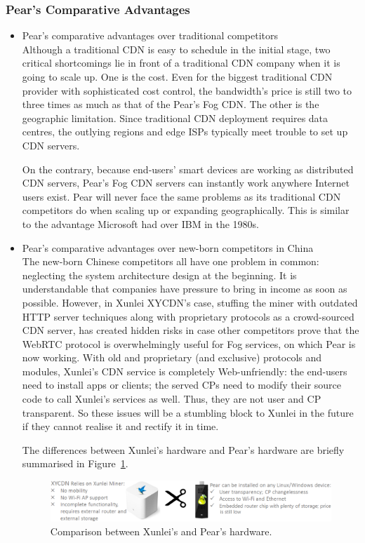 \subsubsection{Pear's Comparative Advantages}
\begin{itemize}
	\item Pear's comparative advantages over traditional competitors\\
	Although a traditional CDN is easy to schedule in the initial stage, two critical shortcomings lie in front of a traditional CDN company when it is going to scale up. One is the cost. Even for the biggest traditional CDN provider with sophisticated cost control, the bandwidth's price is still two to three times as much as that of the Pear's Fog CDN. The other is the geographic limitation. Since traditional CDN deployment requires data centres, the outlying regions and edge ISPs typically meet trouble to set up CDN servers.
	
	On the contrary, because end-users' smart devices are working as distributed CDN servers, Pear's Fog CDN servers can instantly work anywhere Internet users exist. Pear will never face the same problems as its traditional CDN competitors do when scaling up or expanding geographically. This is similar to the advantage Microsoft had over  IBM in the 1980s. 
	
	\item Pear's comparative advantages over new-born competitors in China\\
	The new-born Chinese competitors all have one problem in common: neglecting the system architecture design at the beginning. It is understandable that companies have pressure to bring in income as soon as possible. However, in Xunlei XYCDN's case, stuffing the miner with outdated HTTP server techniques along with proprietary protocols as a crowd-sourced CDN server, has created hidden risks in case other competitors prove that the WebRTC protocol is overwhelmingly useful for Fog services, on which Pear is now working. With old and proprietary (and exclusive) protocols and modules, Xunlei's CDN service is completely Web-unfriendly: the end-users need to install apps or clients; the served CPs need to modify their source code to call Xunlei's services as well. Thus, they are not user and CP transparent. So these issues will be a stumbling block to Xunlei in the future if they cannot realise it and rectify it in time. 
	
	The differences between Xunlei's hardware and Pear's hardware are briefly summarised in Figure~\ref{fig:hw-comp-xunlei}.
	\begin{figure}[ht]
		\centering
		\includegraphics[width=.88\textwidth]{fig/biz/hw_comp_xunlei.png}
		\caption{Comparison between Xunlei's and Pear's hardware.} \label{fig:hw-comp-xunlei}
	\end{figure}
	

\end{itemize}
